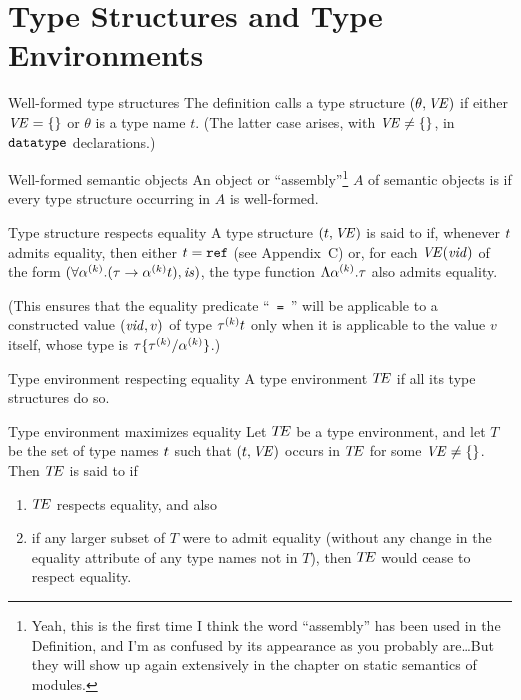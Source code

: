 \section{Type Structures and Type Environments}

\begin{definition}{Well-formed type structures}
The definition calls a type structure $(\theta,\textit{V\kern-.05emE\/})$
 if either $\textit{V\kern-.05emE\/}=\{\}$ or $\theta$ is a type
name $t$.
(The latter case arises, with $\textit{V\kern-.05emE\/}\neq\{\}$, in ${\tt datatype}$ declarations.)
\end{definition}

\begin{definition}{Well-formed semantic objects}
An object or ``assembly''\footnote{Yeah, this is the first time I think the
word ``assembly'' has been used in the Definition, and I'm as confused
by its appearance as you probably are\dots But they will show up again
extensively in the chapter on static semantics of modules.} $A$ of semantic objects is  if every type structure
occurring in $A$ is well-formed.
\end{definition}

\begin{definition}{Type structure respects equality}
A type structure $(t,\textit{V\kern-.05emE\/})$ is said to  if,
whenever $t$ admits equality, then either $t=\mbox{\tt ref}$ (see
Appendix~C) or, for each $\textit{V\kern-.05emE\/}(\textit{vid\/})$ of the form
$(\forall\mbox{$\alpha^{(k)}$}.(\tau\rightarrow\mbox{$\alpha^{(k)}$}t), \textit{is\/})$,
the type function $\Lambda\mbox{$\alpha^{(k)}$}.\tau$ also admits equality.

(This ensures that the equality predicate ``~{\tt =}~'' will be applicable
to a constructed value $(\textit{vid\/},v)$ of type $\mbox{$\tau^{(k)}$}t$ only when it is
applicable to the value $v$ itself, whose type is
$\tau\{\mbox{$\tau^{(k)}$}/\mbox{$\alpha^{(k)}$}\}$.)
\end{definition}

\begin{definition}{Type environment respecting equality}
A type environment $\mbox{$T\!E$}$  if all its type
structures do so.
\end{definition}

\begin{definition}{Type environment maximizes equality}
Let $\mbox{$T\!E$}$ be a type environment, and let $T$ be the set of type names
$t$ such that $(t,\textit{V\kern-.05emE\/})$ occurs in $\mbox{$T\!E$}$ for some $\textit{V\kern-.05emE\/}\neq\{\}$.
Then $\mbox{$T\!E$}$ is said to  if
\begin{enumerate}
\item $\mbox{$T\!E$}$ respects equality, and also
\item if any larger subset of $T$ were to admit equality (without any
  change in the equality attribute of any type names not in $T$), then
  $\mbox{$T\!E$}$ would cease to respect equality.
\end{enumerate}
\end{definition}

